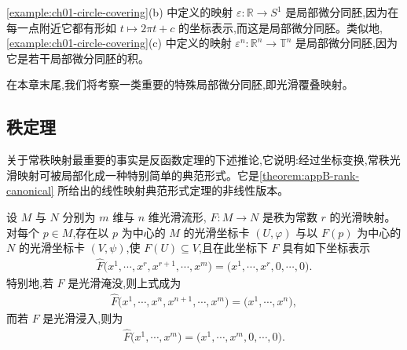 \documentclass[../../main.tex]{subfiles}
\begin{document}
\begin{example}\label{example:ch04-local-diffeomorphisms}
\cref{example:ch01-circle-covering}(b) 中定义的映射 $\varepsilon:\mathbb{R}\to S^1$ 是局部微分同胚,因为在每一点附近它都有形如 $t\mapsto 2\pi t+c$ 的坐标表示,而这是局部微分同胚。类似地, \cref{example:ch01-circle-covering}(c) 中定义的映射 $\varepsilon^n:\mathbb{R}^n\to\mathbb{T}^n$ 是局部微分同胚,因为它是若干局部微分同胚的积。
\end{example}

在本章末尾,我们将考察一类重要的特殊局部微分同胚,即光滑覆叠映射。

\subsection{秩定理}\label{subsection:ch04-rank-theorem}

关于常秩映射最重要的事实是反函数定理的下述推论,它说明:经过坐标变换,常秩光滑映射可被局部化成一种特别简单的典范形式。它是\cref{theorem:appB-rank-canonical} 所给出的线性映射典范形式定理的非线性版本。

\begin{theorem}\label{theorem:ch04-rank-theorem}
设 $M$ 与 $N$ 分别为 $m$ 维与 $n$ 维光滑流形, $F:M\to N$ 是秩为常数 $r$ 的光滑映射。对每个 $p\in M$,存在以 $p$ 为中心的 $M$ 的光滑坐标卡 $(U,\varphi)$ 与以 $F(p)$ 为中心的 $N$ 的光滑坐标卡 $(V,\psi)$,使 $F(U)\subseteq V$,且在此坐标下 $F$ 具有如下坐标表示
\begin{align}\label{align:ch04-rank-canonical}
\widehat{F}\bigl(x^1,\cdots ,x^r,x^{r+1},\cdots ,x^m\bigr)=\bigl(x^1,\cdots ,x^r,0,\cdots ,0\bigr).
\end{align}
特别地,若 $F$ 是光滑淹没,则上式成为
\begin{align}\label{align:ch04-rank-submersion}
\widehat{F}\bigl(x^1,\cdots ,x^n,x^{n+1},\cdots ,x^m\bigr)=\bigl(x^1,\cdots ,x^n\bigr),
\end{align}
而若 $F$ 是光滑浸入,则为
\begin{align}\label{align:ch04-rank-immersion}
\widehat{F}\bigl(x^1,\cdots ,x^m\bigr)=\bigl(x^1,\cdots ,x^m,0,\cdots ,0\bigr).
\end{align}
\end{theorem}
\end{document}
